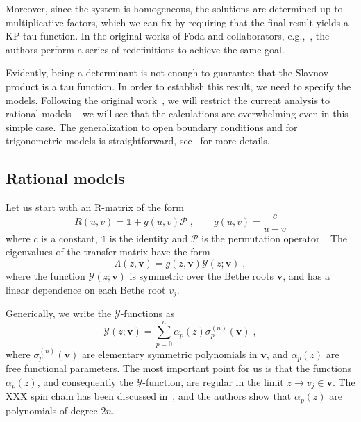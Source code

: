 \documentclass[a4paper,12pt]{amsart}
\begin{document}
Moreover, since the system is homogeneous, the solutions are
determined up to multiplicative factors, which we can fix by
requiring that the final result yields a KP tau function. In the
original works of Foda and collaborators, e.g.,~\cite{Foda:2009zz,
  Wheeler:2010vmq}, the authors perform a series of redefinitions to
achieve the same goal.

Evidently, being a determinant is not enough to guarantee that the
Slavnov product is a tau function.  In order to establish this
result, we need to specify the models. Following the original
work~\cite{Belliard:2019bfz}, we will restrict the current analysis to rational models
-- we will see that the calculations are overwhelming even in this
simple case. The generalization to open boundary conditions and for
trigonometric models is straightforward, see~\cite{Slavnov:2019aba} for more
details.

\subsection{Rational models}

Let us start with an R-matrix of the form
\begin{equation}
  R(u,v) = \mathbb{1} + g(u,v) \mathcal{P}\; , \qquad
  g(u,v) = \frac{c}{u - v}
\end{equation}
where \(c\) is a constant, \(\mathbb{1}\) is the identity and
\(\mathcal{P}\) is the permutation operator~\cite{Slavnov:2019aba}.
The eigenvalues of the transfer matrix have the form
\begin{equation}
  \Lambda(z, \bm{v}) = g(z, \bm{v}) \mathcal{Y}(z; \bm{v})\; ,
\end{equation}
where the function \(\mathcal{Y}(z; \bm{v})\) is symmetric over the
Bethe roots \(\bm{v}\), and has a linear dependence on each Bethe root
\(v_j\).

Generically, we write the \(\mathcal{Y}\)-functions as 
\begin{equation}
\label{eq:yfunc-exp}
  \mathcal{Y}(z; \bm{v}) = \sum_{p=0}^n \alpha_p(z) \sigma_p^{(n)}(\bm{v})\; , 
\end{equation}
where \(\sigma_p^{(n)}(\bm{v})\) are elementary symmetric polynomials
in \(\bm{v}\), and \(\alpha_p(z)\) are free functional parameters.
The most important point for us is that the functions \(\alpha_p(z)\), 
and consequently the \(\mathcal{Y}\)-function, are regular in the limit
\(z \to v_j \in \bm{v}\). The XXX spin chain has been discussed
in~\cite{Belliard:2019bfz}, and the authors show that \(\alpha_p(z)\)
are polynomials of degree \(2n\).
\end{document}
